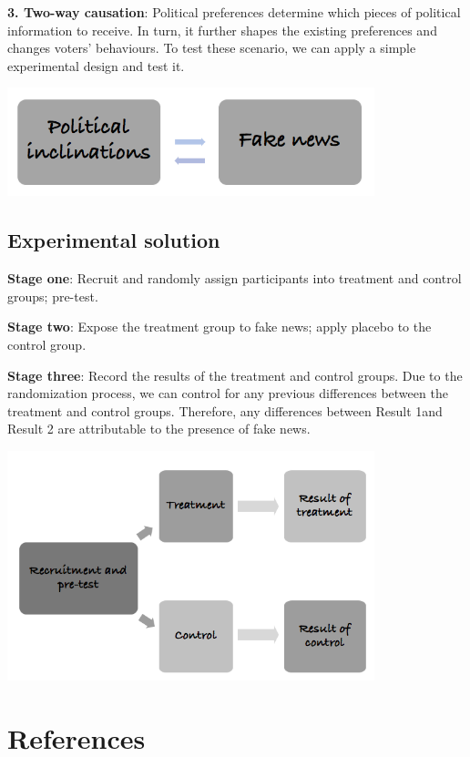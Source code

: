 \documentclass[]{book}
\begin{document}
\textbf{3. Two-way causation}: Political preferences determine which pieces of political information to receive. In turn, it further shapes the existing preferences and changes voters' behaviours. To test these scenario, we can apply a simple experimental design and test it.

\includegraphics[width=0.8\textwidth,height=\textheight]{fig/scenario3.png}

\hypertarget{experimental-solution}{%
\section{Experimental solution}\label{experimental-solution}}

\textbf{Stage one}: Recruit and randomly assign participants into treatment and control groups; pre-test.

\textbf{Stage two}: Expose the treatment group to fake news; apply placebo to the control group.

\textbf{Stage three}: Record the results of the treatment and control groups. Due to the randomization process, we can control for any previous differences between the treatment and control groups. Therefore, any differences between Result 1and Result 2 are attributable to the presence of fake news.

\includegraphics[width=0.8\textwidth,height=\textheight]{fig/stage1.png}

\hypertarget{references}{%
\chapter{References}\label{references}}
\end{document}
